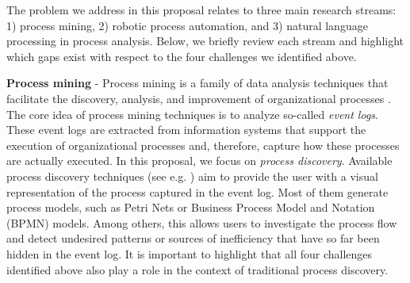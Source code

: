  
The problem we address in this proposal relates to three main research streams: 1) process mining, 2) robotic process automation, and 3) natural language processing in process analysis. Below, we briefly review each stream and highlight which gaps exist with respect to the four challenges we identified above.  

\textbf{Process mining} - Process mining is a family of data analysis techniques that facilitate the discovery, analysis, and improvement of organizational processes \cite{van2016data}. The core idea of process mining techniques is to analyze so-called \textit{event logs}. These event logs are extracted from information systems that support the execution of organizational processes and, therefore, capture how these processes are actually executed. In this proposal, we focus on \textit{process discovery}. Available process discovery techniques (see e.g. \cite{gunther2007fuzzy,weijters2011flexible,leemans2013discovering}) aim to provide the user with a visual representation of the process captured in the event log. Most of them generate process models, such as Petri Nets or Business Process Model and Notation (BPMN) models. Among others, this allows users to investigate the process flow and detect undesired patterns or sources of inefficiency that have so far been hidden in the event log. It is important to highlight that all four challenges identified above also play a role in the context of traditional process discovery. 

